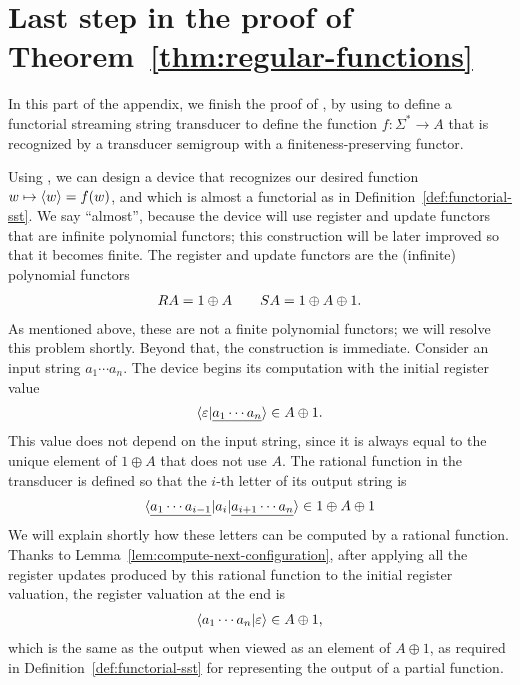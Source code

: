 \section{Last step in the proof of Theorem~\ref{thm:regular-functions}}
In this part of the appendix, we finish the proof of , by using  to define a functorial streaming string transducer to define the function $f : \Sigma^* \to A$ that is recognized by a transducer semigroup with a finiteness-preserving functor. 

Using , we can design a device that  recognizes our desired function $w \mapsto \langle w \rangle=f(w)$, and which is almost a functorial \sst as in Definition~\ref{def:functorial-sst}. We say ``almost'', because the device will use register and update functors that are  infinite polynomial functors; this construction will be later improved so that it becomes finite.  The register and update functors are the (infinite) polynomial functors
\begin{align*}
\functorr A  = 1 \oplus A \qquad \functors A = 1 \oplus A \oplus 1.
\end{align*}
As mentioned above, these are  not a finite polynomial functors; we will resolve this problem shortly.  
Beyond that, the construction is immediate. Consider an input string 
$a_1 \cdots a_n$. The device begins its computation with the  initial register value 
\begin{align*}
    \langle \varepsilon | \underline{a_1 \cdots a_n} \rangle \in A \oplus 1.
\end{align*}
This value does not depend on the input string, since it is always equal to the unique element of $1 \oplus A$ that does not use $A$.
The rational function  in the transducer is defined so that the $i$-th letter of its output string is 
\begin{align*}
\langle \underline{a_1 \cdots a_{i-1}}|a_i| \underline{a_{i+1} \cdots a_n} \rangle \in 1 \oplus A \oplus 1
\end{align*}
We will explain shortly how these letters  can be computed by a rational function.
Thanks to Lemma~\ref{lem:compute-next-configuration}, after applying all the register updates produced by this rational function to the initial register valuation, the register valuation at the end is 
\begin{align*}
    \langle a_1 \cdots a_n | \varepsilon \rangle \in A \oplus 1,
\end{align*}
which is the same as the output when viewed as an element of $A \oplus 1$, as required in Definition~\ref{def:functorial-sst}  for representing the output of a partial function.

